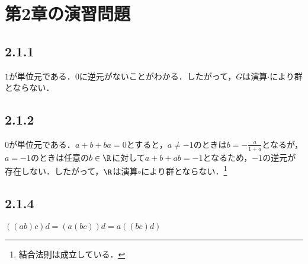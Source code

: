 \documentclass[uplatex,dvipdfmx,a4paper,11pt]{jsarticle}
\newenvironment{tleftbar}{\begin{tbleftline}\setlength{\parindent}{1zw}}{\end{tbleftline}}
\begin{document}
\section*{第2章の演習問題}

\subsection*{2.1.1}
\begin{tleftbar}
    $1$が単位元である．$0$に逆元がないことがわかる．したがって，$G$は演算$\cdot$により群とならない．
\end{tleftbar}


\subsection*{2.1.2}
\begin{tleftbar}
    $0$が単位元である．$a+b+ba=0$とすると，$a\neq -1$のときは$b=-\frac{a}{1+a}$となるが，$a=-1$のときは任意の$b\in \R$に対して$a+b+ab=-1$となるため，$-1$の逆元が存在しない．したがって，$\R$は演算$\circ$により群とならない．\footnote{結合法則は成立している．}
\end{tleftbar}

\subsection*{2.1.4}
\begin{tleftbar}
    $((ab)c)d=(a(bc))d=a((bc)d)$
\end{tleftbar}
\end{document}
